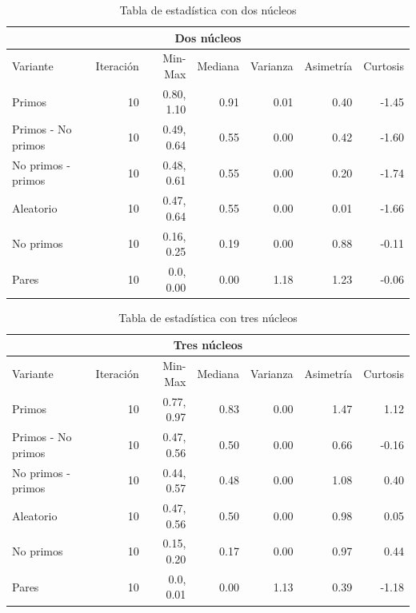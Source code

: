 \documentclass{article}
\begin{document}
\begin{table}[H]
\begin{center}
\begin{tabular}{|l | r | r | r | r | r | r|}
\hline
\multicolumn{7}{|c|}{Dos núcleos}\\
\hline
Variante&Iteración&Min-Max&Mediana&Varianza&Asimetría&Curtosis\\
\hline
 Primos               & 10 & 0.80, 1.10  & 0.91 & 0.01 & 0.40& -1.45\\
 Primos - No primos   & 10 & 0.49, 0.64  & 0.55 & 0.00 & 0.42& -1.60\\
 No primos - primos   & 10 & 0.48, 0.61  & 0.55 & 0.00 & 0.20& -1.74\\
 Aleatorio            & 10 & 0.47, 0.64  & 0.55 & 0.00 & 0.01& -1.66\\
 No primos            & 10 & 0.16, 0.25  & 0.19 & 0.00 & 0.88& -0.11\\
 Pares                & 10 & 0.0, 0.00  & 0.00 & 1.18 & 1.23& -0.06\\
\hline
\end{tabular}
\caption{Tabla de estadística con dos núcleos}
\label{table:1}
\end{center}
\end{table}

\begin{table}[H]
\begin{center}
\begin{tabular}{|l | r | r | r | r | r | r|}
\hline
\multicolumn{7}{|c|}{Tres núcleos}\\
\hline
Variante&Iteración&Min-Max&Mediana&Varianza&Asimetría&Curtosis\\
\hline
 Primos               & 10 & 0.77, 0.97  & 0.83 & 0.00 & 1.47  & 1.12\\
 Primos - No primos   & 10 & 0.47, 0.56 & 0.50   & 0.00 &0.66& -0.16\\
 No primos - primos   & 10 & 0.44, 0.57  &0.48 & 0.00 & 1.08& 0.40\\
 Aleatorio            & 10 & 0.47, 0.56  & 0.50 & 0.00 &0.98& 0.05\\
 No primos            & 10 & 0.15, 0.20  & 0.17 & 0.00 & 0.97&0.44\\
 Pares                & 10 & 0.0, 0.01  & 0.00 & 1.13 & 0.39& -1.18\\
\hline
\end{tabular}
\caption{Tabla de estadística con tres núcleos}
\label{table:1}
\end{center}
\end{table}
\end{document}
